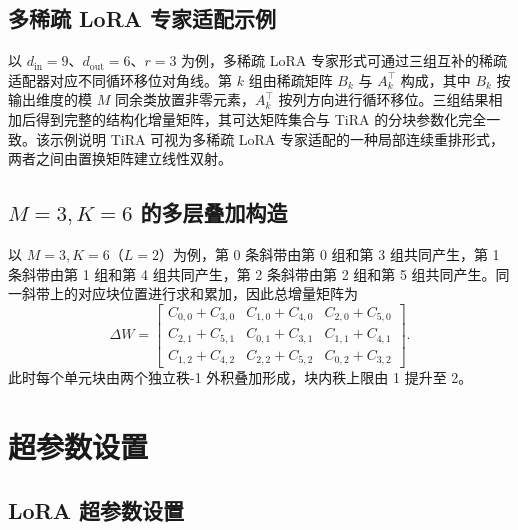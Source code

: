 \documentclass[UTF8,a4paper,11pt]{ctexart}
\newcommand{\DeltaW}{\Delta W}
\begin{document}
\subsection{多稀疏 LoRA 专家适配示例}
\label{app:sparse_expert}

以 $d_{\mathrm{in}}=9$、$d_{\mathrm{out}}=6$、$r=3$ 为例，多稀疏 LoRA 专家形式可通过三组互补的稀疏适配器对应不同循环移位对角线。第 $k$ 组由稀疏矩阵 $B_k$ 与 $A_k^{\top}$ 构成，其中 $B_k$ 按输出维度的模 $M$ 同余类放置非零元素，$A_k^{\top}$ 按列方向进行循环移位。三组结果相加后得到完整的结构化增量矩阵，其可达矩阵集合与 TiRA 的分块参数化完全一致。该示例说明 TiRA 可视为多稀疏 LoRA 专家适配的一种局部连续重排形式，两者之间由置换矩阵建立线性双射。

\subsection{$M=3,K=6$ 的多层叠加构造}
\label{app:m3k6}

以 $M=3,K=6$（$L=2$）为例，第 0 条斜带由第 0 组和第 3 组共同产生，第 1 条斜带由第 1 组和第 4 组共同产生，第 2 条斜带由第 2 组和第 5 组共同产生。同一斜带上的对应块位置进行求和累加，因此总增量矩阵为
\begin{equation}
\DeltaW=
\begin{bmatrix}
C_{0,0}+C_{3,0} & C_{1,0}+C_{4,0} & C_{2,0}+C_{5,0}\\
C_{2,1}+C_{5,1} & C_{0,1}+C_{3,1} & C_{1,1}+C_{4,1}\\
C_{1,2}+C_{4,2} & C_{2,2}+C_{5,2} & C_{0,2}+C_{3,2}
\end{bmatrix}.
\end{equation}
此时每个单元块由两个独立秩-1 外积叠加形成，块内秩上限由 1 提升至 2。

\section{超参数设置}

\subsection{LoRA 超参数设置}
\label{app:lora_hyperparams}
\end{document}
